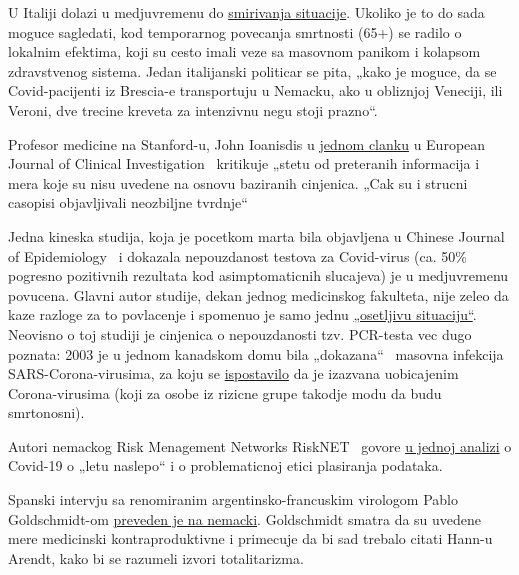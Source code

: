 U Italiji dolazi u medjuvremenu do
\href{https://www.tagesspiegel.de/politik/die-verlangsamung-ist-da-in-italien-zeichnet-sich-die-wende-in-der-coronakrise-ab/25698124.html}{smirivanja
situacije}. Ukoliko je to do sada moguce sagledati, kod temporarnog
povecanja smrtnosti (65+) se radilo o lokalnim efektima, koji su cesto
imali veze sa masovnom panikom i kolapsom zdravstvenog sistema. Jedan
italijanski politicar se pita, „kako je moguce, da se Covid-pacijenti iz
Brescia-e transportuju u Nemacku, ako u obliznjoj Veneciji, ili Veroni,
dve trecine kreveta za intenzivnu negu stoji prazno``.

Profesor medicine na Stanford-u, John Ioanisdis u
\href{https://onlinelibrary.wiley.com/doi/full/10.1111/eci.13222}{jednom
clanku} u European Journal of Clinical Investigation ~kritikuje „stetu
od preteranih informacija i mera koje su nisu uvedene na osnovu
baziranih cinjenica. „Cak su i strucni casopisi objavljivali neozbiljne
tvrdnje``

Jedna kineska studija, koja je pocetkom marta bila objavljena u Chinese
Journal of Epidemiology ~i dokazala nepouzdanost testova za Covid-virus
(ca. 50\% pogresno pozitivnih rezultata kod asimptomaticnih slucajeva)
je u medjuvremenu povucena. Glavni autor studije, dekan jednog
medicinskog fakulteta, nije zeleo da kaze razloge za to povlacenje i
spomenuo je samo jednu
\href{https://choice.npr.org/index.html?origin=https://www.npr.org/sections/health-shots/2020/03/26/822084429/in-defense-of-coronavirus-testing-strategy-administration-cited-retracted-study}{„osetljivu
situaciju``}. Neovisno o toj studiji je cinjenica o nepouzdanosti tzv.
PCR-testa vec dugo poznata: 2003 je u jednom kanadskom domu bila
„dokazana`` ~masovna infekcija SARS-Corona-virusima, za koju se
\href{https://www.ncbi.nlm.nih.gov/pmc/articles/PMC2095096/}{ispostavilo}
da je izazvana uobicajenim Corona-virusima (koji za osobe iz rizicne
grupe takodje modu da budu smrtonosni).

Autori nemackog Risk Menagement Networks RiskNET ~govore
\href{https://www.risknet.de/themen/risknews/covid-19-und-der-blindflug/}{u
jednoj analizi} o Covid-19 o „letu naslepo`` i o problematicnoj etici
plasiranja podataka.

Spanski intervju sa renomiranim argentinsko-francuskim virologom Pablo
Goldschmidt-om
\href{https://www.rubikon.news/artikel/der-corona-totalitarismus}{preveden
je na nemacki}. Goldschmidt smatra da su uvedene mere medicinski
kontraproduktivne i primecuje da bi sad trebalo citati Hann-u Arendt,
kako bi se razumeli izvori totalitarizma.

